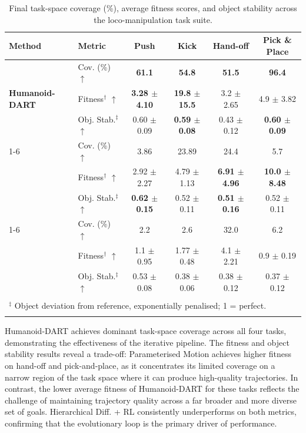 \documentclass{article}
\newcommand{\papertitle}{Humanoid-DART}
\begin{document}
\begin{table}[h]
\centering
\caption{Final task-space coverage (\%), average fitness scores, and object stability across the loco-manipulation task suite.}
\small
\label{tab:coverage_tasks}
\begin{tabular}{llcccc}
\toprule
\textbf{Method} & \textbf{Metric}
  & \textbf{Push} 
  & \textbf{Kick} 
  & \textbf{Hand-off} 
  & \textbf{Pick \& Place} \\
\midrule
\multirow{3}{*}{\textbf{\papertitle}}
  & Cov. (\%) $\uparrow$              & \textbf{61.1} & \textbf{54.8} & \textbf{51.5} & \textbf{96.4} \\
  & Fitness$^\dagger$ $\uparrow$      & \textbf{3.28 $\pm$ 4.10} & \textbf{19.8 $\pm$ 15.5} & 3.2 $\pm$ 2.65 & 4.9 $\pm$ 3.82 \\
  & Obj. Stab.$^\ddagger$ $\uparrow$ & 0.60 $\pm$ 0.09 & \textbf{0.59 $\pm$ 0.08} & 0.43 $\pm$ 0.12 & \textbf{0.60 $\pm$ 0.09} \\
\cmidrule(lr){1-6}
\multirow{3}{*}{Param. Motion~\cite{10.1145/3450626.3459774}}
  & Cov. (\%) $\uparrow$              & 3.86 & 23.89   & 24.4 & 5.7 \\
  & Fitness$^\dagger$ $\uparrow$      & 2.92 $\pm$ 2.27 & 4.79 $\pm$ 1.13 & \textbf{6.91 $\pm$ 4.96} & \textbf{10.0 $\pm$ 8.48} \\
  & Obj. Stab.$^\ddagger$ $\uparrow$ & \textbf{0.62 $\pm$ 0.15} & 0.52 $\pm$ 0.11 & \textbf{0.51 $\pm$ 0.16} & 0.52 $\pm$ 0.11 \\
\cmidrule(lr){1-6}
\multirow{3}{*}{Hier. Diff. + RL}
  & Cov. (\%) $\uparrow$              & 2.2  & 2.6  & 32.0 & 6.2 \\
  & Fitness$^\dagger$ $\uparrow$      & 1.1 $\pm$ 0.95 & 1.77 $\pm$ 0.48 & 4.1 $\pm$ 2.21 & 0.9 $\pm$ 0.19 \\
  & Obj. Stab.$^\ddagger$ $\uparrow$ & 0.53 $\pm$ 0.08 & 0.38 $\pm$ 0.06 & 0.38 $\pm$ 0.12 & 0.37 $\pm$ 0.12 \\
\bottomrule
\addlinespace[4pt]
\multicolumn{6}{l}{\small $^\dagger$ Avg. Fitness scaled by $\times 10^{-3}$.} \\
\multicolumn{6}{l}{\small $^\ddagger$ Object deviation from reference, exponentially penalised; 1 = perfect.} \\
\normalsize
\end{tabular}
\end{table}

Humanoid-DART achieves dominant task-space coverage across all four tasks, demonstrating the effectiveness of the iterative pipeline. The fitness and object stability results reveal a trade-off: Parameterised Motion achieves higher fitness on hand-off and pick-and-place, as it concentrates its limited coverage on a narrow region of the task space where it can produce high-quality trajectories. In contrast, the lower average fitness of Humanoid-DART for these tasks reflects the challenge of maintaining trajectory quality across a far broader and more diverse set of goals. Hierarchical Diff. + RL consistently underperforms on both metrics, confirming that the evolutionary loop is the primary driver of performance.
\end{document}

